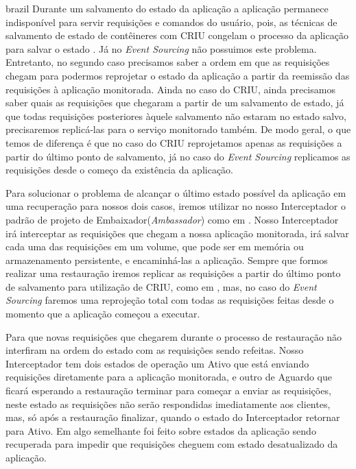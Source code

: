 \begin{otherlanguage*}{brazil}
Durante um salvamento do estado da aplicação a aplicação permanece indisponível para
servir requisições e comandos do usuário, pois, as técnicas de salvamento de estado
de contêineres com CRIU congelam o processo da aplicação para salvar o estado
\cite{vayghan2021kubernetes}. Já no \textit{Event Sourcing} não possuimos este problema.
Entretanto, no segundo caso precisamos saber a ordem em que as requisições chegam para
podermos reprojetar o estado da aplicação a partir da reemissão das requisições à aplicação
monitorada. Ainda no caso do CRIU, ainda precisamos saber quais as requisições que chegaram
a partir de um salvamento de estado, já que todas requisições posteriores àquele salvamento
não estaram no estado salvo, precisaremos replicá-las para o serviço monitorado também. De
modo geral, o que temos de diferença é que no caso do CRIU reprojetamos apenas as requisições
a partir do último ponto de salvamento, já no caso do \textit{Event Sourcing} replicamos
as requisições desde o começo da existência da aplicação.

Para solucionar o problema de alcançar o último estado possível da aplicação em uma
recuperação para nossos dois casos, iremos utilizar no nosso Interceptador o padrão de projeto
de Embaixador(\textit{Ambassador}) como em \cite{muller2022architecture}. Nosso Interceptador
irá interceptar as requisições que chegam a nossa aplicação monitorada, irá salvar cada uma
das requisições em um volume, que pode ser em memória ou armazenamento persistente, e
encaminhá-las a aplicação. Sempre que formos realizar uma restauração iremos replicar as
requisições a partir do último ponto de salvamento para utilização de CRIU, como em 
\cite{muller2022architecture}, mas, no caso do \textit{Event Sourcing} faremos uma
reprojeção total com todas as requisições feitas desde o momento que a aplicação começou a
executar.

Para que novas requisições que chegarem durante o processo de restauração não interfiram na
ordem do estado com as requisições sendo refeitas. Nosso Interceptador tem dois estados de
operação um Ativo que está enviando requisições diretamente para a aplicação monitorada, e
outro de Aguardo que ficará esperando a restauração terminar para começar a enviar as
requisições, neste estado as requisições não serão respondidas imediatamente aos clientes,
mas, só após a restauração finalizar, quando o estado do Interceptador retornar para Ativo.
Em \cite{vayghan2021kubernetes} algo semelhante foi feito sobre estados da aplicação sendo
recuperada para impedir que requisições cheguem com estado desatualizado da aplicação.


\end{otherlanguage*}
